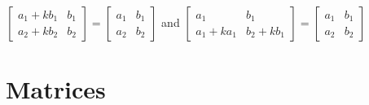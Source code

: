 \documentclass[12pt]{article}
\begin{document}
\begin{flushleft}
\begin{enumerate}
	$ \begin{bmatrix}
	a_1 + kb_1 & b_1 \\ 
	a_2 + kb_2 & b_2
	\end{bmatrix} = 
	\begin{bmatrix}
	a_1 & b_1 \\ 
	a_2 & b_2
	\end{bmatrix} $ and 
	$ \begin{bmatrix}
	a_1 & b_1 \\ 
	a_1 + ka_1 & b_2 + kb_1 
	\end{bmatrix} = 
	\begin{bmatrix}
	a_1 & b_1 \\ 
	a_2 & b_2
	\end{bmatrix} $ \linebreak 
	\end{enumerate}


	\pagebreak
	
	
	\section{Matrices}


\end{flushleft}
\end{document}
